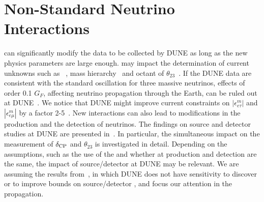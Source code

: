 \section{Non-Standard Neutrino Interactions}
\label{sec:nsi}
 can significantly modify the data to be collected by DUNE as long as the new physics parameters are large enough.  may impact the determination of current unknowns such as ~\cite{Masud:2015xva,Masud:2016bvp}, mass hierarchy~\cite{Masud:2016gcl} and octant of $\theta_{23}$~\cite{Agarwalla:2016fkh}. If the DUNE data are consistent with the standard oscillation for three massive neutrinos,   effects of order 0.1 $G_F$, affecting neutrino propagation through the Earth, can be ruled out at DUNE~\cite{deGouvea:2015ndi,Coloma:2015kiu}. We notice that DUNE might improve current constraints on $|\epsilon^m_{e \tau}|$ and $|\epsilon^m_{e \mu}|$ by a factor 2-5~\cite{Ohlsson:2012kf,Miranda:2015dra,Farzan:2017xzy}. New    interactions can also lead to modifications in the production and the detection of neutrinos. The findings on source and detector  studies at DUNE are presented in~\cite{Blennow:2016etl,Bakhti:2016gic}. In particular, the simultaneous impact on the measurement of $\delta_{\rm CP}$ and $\theta_{23}$ is investigated in detail. Depending on the assumptions, such as the use of the   and whether  at production and detection are the same, the impact of source/detector  at DUNE may be relevant. We are assuming the results from~\cite{Blennow:2016etl}, in which DUNE does not have sensitivity to discover or to improve bounds on source/detector , and focus our attention in the propagation.


